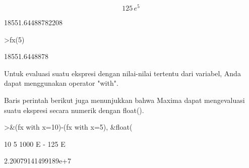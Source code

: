 \documentclass[12pt,arial,letterpaper]{book}
\begin{document}
\begin{eulercomment}
\begin{eulercomment}
\begin{euleroutput}
\end{euleroutput}
\begin{eulerformula}
\[
125\,e^5
\]
\end{eulerformula}
\begin{euleroutput}
  
                            18551.64488782208
  
\end{euleroutput}
\begin{eulerprompt}
>fx(5)
\end{eulerprompt}
\begin{euleroutput}
  18551.6448878
\end{euleroutput}
\begin{eulercomment}
Untuk evaluasi suatu ekspresi dengan nilai-nilai tertentu dari
variabel, Anda dapat menggunakan operator "with".

Baris perintah berikut juga menunjukkan bahwa Maxima dapat
mengevaluasi suatu ekspresi secara numerik dengan float().
\end{eulercomment}
\begin{eulerprompt}
>&(fx with x=10)-(fx with x=5), &float(%
\end{eulerprompt}
\begin{euleroutput}
  
                                  10        5
                            1000 E   - 125 E
  
  
                           2.20079141499189e+7
  

\end{euleroutput}
\end{eulercomment}
\end{eulercomment}
\end{document}
